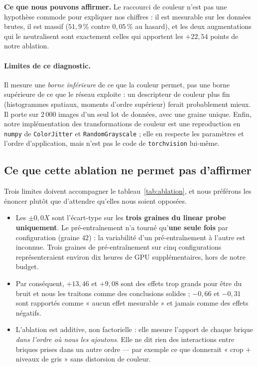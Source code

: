 \documentclass[11pt,a4paper]{article}
\newcommand{\encadre}[1]{%
  \par\vspace{4pt}\noindent
  \colorbox{fondgris}{\parbox{\dimexpr\textwidth-2\fboxsep}{\small #1}}%
  \par\vspace{4pt}}
\begin{document}
\encadre{\textbf{Ce que nous pouvons affirmer.} Le raccourci de couleur n'est pas une
hypothèse commode pour expliquer nos chiffres : il est mesurable sur les données brutes,
il est massif ($51{,}9\,\%$ contre $0{,}05\,\%$ au hasard), et les deux augmentations qui le
neutralisent sont exactement celles qui apportent les $+22{,}54$ points de notre ablation.}

\paragraph{Limites de ce diagnostic.} Il mesure une \emph{borne inférieure} de ce que la
couleur permet, pas une borne supérieure de ce que le réseau exploite : un descripteur de
couleur plus fin (histogrammes spatiaux, moments d'ordre supérieur) ferait probablement
mieux. Il porte sur 2\,000 images d'un seul lot de données, avec une graine unique. Enfin,
notre implémentation des transformations de couleur est une reproduction en \texttt{numpy}
de \texttt{ColorJitter} et \texttt{RandomGrayscale} ; elle en respecte les paramètres et
l'ordre d'application, mais n'est pas le code de \texttt{torchvision} lui-même.

\subsection{Ce que cette ablation ne permet pas d'affirmer}

Trois limites doivent accompagner le tableau~\ref{tab:ablation}, et nous préférons les
énoncer plutôt que d'attendre qu'elles nous soient opposées.

\begin{itemize}
\item Les $\pm 0{,}0X$ sont l'écart-type sur les \textbf{trois graines du linear probe
uniquement}. Le pré-entraînement n'a tourné qu'\textbf{une seule fois} par configuration
(graine $42$) : la variabilité d'un pré-entraînement à l'autre est inconnue. Trois graines de
pré-entraînement sur cinq configurations représenteraient environ dix heures de GPU
supplémentaires, hors de notre budget.
\item Par conséquent, $+13{,}46$ et $+9{,}08$ sont des effets trop grands pour être du bruit
et nous les traitons comme des conclusions solides ; $-0{,}66$ et $-0{,}31$ sont rapportés
comme « aucun effet mesurable » et jamais comme des effets négatifs.
\item L'ablation est additive, non factorielle : elle mesure l'apport de chaque brique
\emph{dans l'ordre où nous les ajoutons}. Elle ne dit rien des interactions entre briques
prises dans un autre ordre --- par exemple ce que donnerait « crop $+$ niveaux de gris » sans
distorsion de couleur.
\end{itemize}
\end{document}
